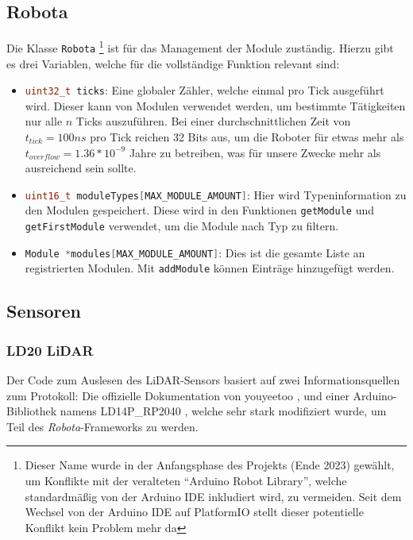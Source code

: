 \subsection{Robota}
Die Klasse \texttt{Robota}%
\footnote{Dieser Name wurde in der Anfangsphase des Projekts (Ende 2023) gewählt, 
        um Konflikte mit der veralteten ``Arduino Robot Library'',
        welche standardmäßig von der Arduino IDE inkludiert wird,
        zu vermeiden.
        Seit dem Wechsel von der Arduino IDE auf PlatformIO stellt dieser potentielle Konflikt kein Problem mehr da}
ist für das Management der Module zuständig.
%
Hierzu gibt es drei Variablen, welche für die vollständige Funktion relevant sind:
\begin{itemize}
    \item \lstinline[language=c]|uint32_t ticks|:
        Eine globaler Zähler, welche einmal pro Tick ausgeführt wird.
        Dieser kann von Modulen verwendet werden, um bestimmte Tätigkeiten nur alle $n$ Ticks auszuführen.
        Bei einer durchschnittlichen Zeit von $t_{tick}=100ns$ pro Tick reichen 32 Bits aus,
        um die Roboter für etwas mehr als $t_{overflow}=1.36*10^{-9}$ Jahre zu betreiben,
        was für unsere Zwecke mehr als ausreichend sein sollte.
    \item \lstinline[language=c]|uint16_t moduleTypes[MAX_MODULE_AMOUNT]|:
        Hier wird Typeninformation zu den Modulen gespeichert.
        Diese wird in den Funktionen \texttt{getModule} und \texttt{getFirstModule} verwendet,
        um die Module nach Typ zu filtern.
    \item \lstinline[language=c]|Module *modules[MAX_MODULE_AMOUNT]|:
        Dies ist die gesamte Liste an registrierten Modulen.
        Mit \texttt{addModule} können Einträge hinzugefügt werden.
\end{itemize}

\subsection{Sensoren}
\subsubsection{LD20 LiDAR}
Der Code zum Auslesen des LiDAR-Sensors basiert auf zwei Informationsquellen zum Protokoll:
%
Die offizielle Dokumentation von youyeetoo \cite{youyeetoo-ld20},
und einer Arduino-Bibliothek namens LD14P\_RP2040 \cite{ld20-library},
welche sehr stark modifiziert wurde, um Teil des \textit{Robota}-Frameworks zu werden.

